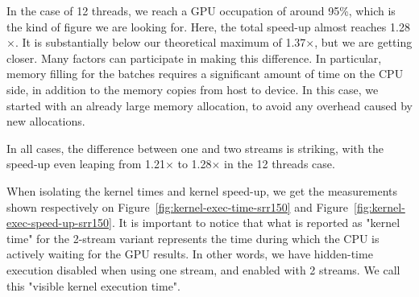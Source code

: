 In the case of 12 threads, we reach a GPU occupation of around 95\%, which is the kind of figure we are looking for. Here, the total speed-up almost reaches 1.28$\times$. It is substantially below our theoretical maximum of 1.37$\times$, but we are getting closer. Many factors can participate in making this difference. In particular, memory filling for the batches requires a significant amount of time on the CPU side, in addition to the memory copies from host to device. In this case, we started with an already large memory allocation, to avoid any overhead caused by new allocations.

In all cases, the difference between one and two streams is striking, with the speed-up even leaping from 1.21$\times$ to 1.28$\times$ in the 12 threads case.

When isolating the kernel times and kernel speed-up, we get the measurements shown respectively on Figure~\ref{fig:kernel-exec-time-srr150} and Figure~\ref{fig:kernel-exec-speed-up-srr150}. It is important to notice that what is reported as "kernel time" for the 2-stream variant represents the time during which the CPU is actively waiting for the GPU results. In other words, we have hidden-time execution disabled when using one stream, and enabled with 2 streams. We call this "visible kernel execution time".


